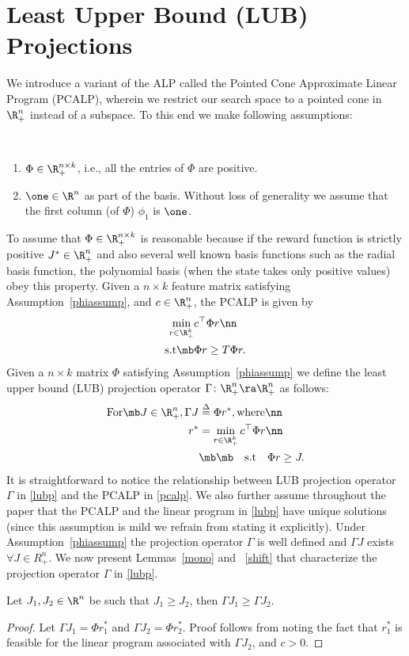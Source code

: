 \section{Least Upper Bound (LUB) Projections}
We introduce a variant of the ALP called the Pointed Cone Approximate Linear Program (PCALP), wherein we restrict our search space to a pointed cone in $\R^n_+$ instead of a subspace. To this end we make following assumptions:
\begin{assumption}\label{phiassump}
\mb\\
\vspace{-20pt}
\begin{enumerate}
\item $\Phi \in \R^{n\times k}_+$, i.e., all the entries of $\Phi$ are positive.
\item $\one \in \R^n$ as part of the basis. Without loss of generality we assume that the first column (of $\Phi$) $\phi_1$  is $\one$.
\end{enumerate}
\end{assumption}
To assume that $\Phi \in \R^{n\times k}_+$ is reasonable because if the reward function is strictly positive $J^*\in \R^n_+$ and also several well known basis functions such as the radial basis function, the polynomial basis (when the state takes only positive values) obey this property.
Given a $n\times k$ feature matrix satisfying Assumption~\ref{phiassump}, and $c \in \R^n_+$, the PCALP is given by
\begin{align}\label{pcalp}
\min_{r\in \R^k_+} &c^\top \Phi r\nn\\
\text{s.t}\mb &\Phi r\geq T \Phi r.
\end{align}
Given a $n\times k$ matrix $\Phi$ satisfying Assumption~\ref{phiassump} we define the least upper bound (LUB) projection operator $\Gamma \colon \R^n_+ \ra \R^n_+$ as follows:
\begin{align}\label{lubp}
\text{For}\mb J\in \R^n_+, \Gamma J&\stackrel{\Delta}=\Phi r^*,\text{where}\nn\\
r^*&=\min_{r \in \R^k_+} c^\top \Phi r\nn\\
&\mb\mb\quad\text{s.t}\quad\Phi r\geq J.
\end{align}
It is straightforward to notice the relationship between LUB projection operator $\Gamma$ in \eqref{lubp} and the PCALP in \eqref{pcalp}. We also further assume throughout the paper that the PCALP and the linear program in \eqref{lubp} have unique solutions (since this assumption is mild we refrain from stating it explicitly). Under Assumption~\ref{phiassump} the projection operator $\Gamma$ is well defined and $\Gamma J$ exists $\forall J \in R^n_+$. 
We now present Lemmas~\ref{mono} and ~\ref{shift} that characterize the projection operator $\Gamma$ in \eqref{lubp}.
\begin{lemma}\label{mono}
Let $J_1, J_2\in \R^n$ be such that $J_1\geq J_2$, then $\Gamma J_1\geq \Gamma J_2$.
\end{lemma}
\begin{proof}
Let $\Gamma J_1=\Phi r_1^*$ and $\Gamma J_2=\Phi r_2^*$. Proof follows from noting the fact that $r_1^*$ is feasible for the linear program associated with $\Gamma J_2$, and $c>0$.
\end{proof}
